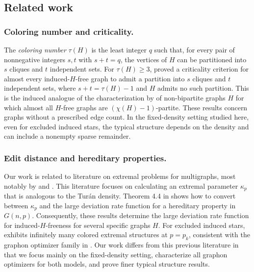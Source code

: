 \subsection{Related work}
\subsubsection{Coloring number and criticality.}\label{subsec:col-num}
The \emph{coloring number} $\tau(H)$ is the least integer $q$ such that, for every pair of nonnegative integers $s,t$ with $s+t=q$, the vertices of $H$ can be partitioned into $s$ cliques and $t$ independent sets. For $\tau(H)\geq3$, \citeauthor{balogh2011excluding} \cite{balogh2011excluding} proved a criticality criterion for almost every induced-$H$-free graph to admit a partition into $s$ cliques and $t$ independent sets, where $s+t=\tau(H)-1$ and $H$ admits no such partition. This is the induced analogue of the characterization by \citeauthor{promel1992asymptotic} \cite{promel1992asymptotic} of non-bipartite graphs $H$ for which almost all $H$-free graphs are $(\chi(H)-1)$-partite. These results concern graphs without a prescribed edge count. In the fixed-density setting studied here, even for excluded induced stars, the typical structure depends on the density and can include a nonempty sparse remainder.

\subsubsection{Edit distance and hereditary properties.}\label{subsec:edit-distance}
Our work is related to literature on extremal problems for multigraphs, most notably by \citeauthor{marchant2010extremal} \cite{marchant2010extremal,marchant2011structure} and \citeauthor{thomason2011graphs} \cite{thomason2011graphs}. This literature focuses on calculating an extremal parameter $\kappa_p$ that is analogous to the Tur\'an density. Theorem 4.4 in \cite{marchant2010extremal} shows how to convert between $\kappa_p$ and the large deviation rate function for a hereditary property in $G(n,p)$. Consequently, these results determine the large deviation rate function for induced-$H$-freeness for several specific graphs $H$. For excluded induced stars, \citeauthor{thomason2011graphs} \cite[Section~7.5]{thomason2011graphs} exhibits infinitely many colored extremal structures at $p=p_k$, consistent with the graphon optimizer family in . Our work differs from this previous literature in that we focus mainly on the fixed-density setting, characterize all graphon optimizers for both models, and prove finer typical structure results.


